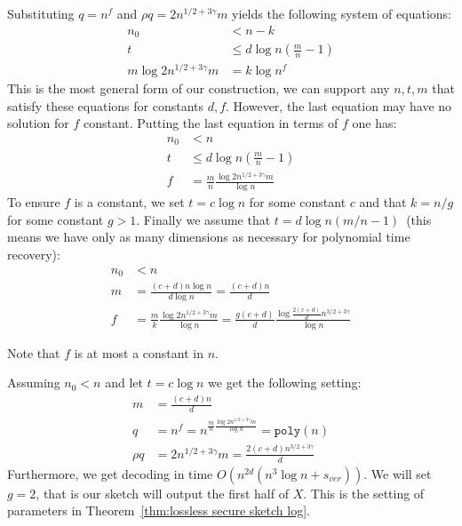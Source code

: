 \documentclass[11pt]{article}
\newcommand{\thref}[1]{\mbox{Theorem~\ref{#1}}}
\newcommand{\poly}{\ensuremath{\mathtt{poly}}\xspace}
\newcommand{\authnote}[2]{{\textcolor{red}{\textsf{#1 notes: }\textcolor{blue}{ #2}}\marginpar{\textcolor{red}{\textbf{!!!!!}}}}}
\newcommand{\authnote}[2]{}
\newcommand{\xnote}[1]{{\authnote{Xianrui}{#1}}}
\begin{document}
Substituting $q = n^f$ and $\rho q = 2n^{1/2+3\gamma}m$ yields the following system of equations:
\begin{align*}
n_0&< n - k\\
t&\leq d\log n\left(\frac{m}{n}-1\right)\\
m \log 2n^{1/2+3\gamma}m &= k \log n^f
\end{align*}
This is the most general form of our construction, we can support any $n, t, m$ that satisfy these equations for constants $d, f$.  However, the last equation may have no solution for $f$ constant.  Putting the last equation in terms of $f$ one has:
\begin{align*}
n_0&< n\\
t&\leq d\log n\left(\frac{ m }{n} -1\right)\\
f &= \frac{m}{n}\frac{\log 2n^{1/2+3\gamma} m}{\log n}
\end{align*}
To ensure $f$ is a constant, we set $t = c \log n$ for some constant $c$ and that $k = n /g$ for some constant $g> 1$.  Finally we assume that $t = d \log n(m/n-1)$~(this means we have only as many dimensions as necessary for polynomial time recovery):
\begin{align*}
n_0&< n\\
m &= \frac{(c+d)n \log n}{d \log n} = \frac{(c+d)n}{d}\\
f &= \frac{m}{k}\frac{\log 2n^{1/2+3\gamma}m}{\log n} = \frac{g(c+d)}{d}\frac{\log \frac{2(c+d)}{d} n^{3/2+3\gamma}}{\log n}
\end{align*}

Note that $f$ is at most a constant in $n$.

Assuming $n_0 < n$ and let $t= c\log n$ we get the following setting:
\begin{align*}
m &= \frac{(c+d)n}{d}\\
q & = n^f = n^{\frac{m}{n}\frac{\log 2n^{1/2+3\gamma}m}{\log n}} = \poly(n)\\
\rho q &= 2n^{1/2+3\gamma}m = \frac{2(c+d)n^{3/2+3\gamma}}{d}
\end{align*}
Furthermore, we get decoding in time $O(n^{2d}(n^3\log n+s_{ver}))$.  We will set $g = 2$, that is our sketch will output the first half of $X$. This is the setting of parameters in \thref{thm:lossless secure sketch log}.
\end{document}

